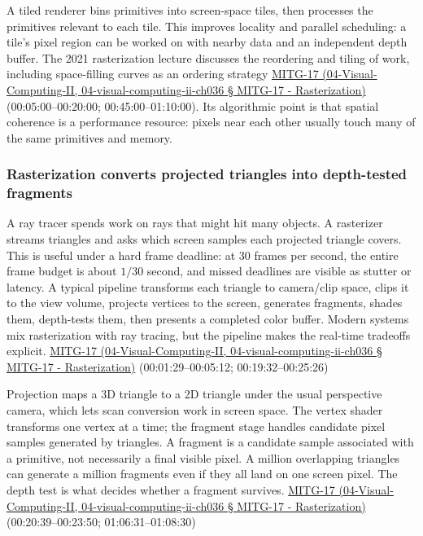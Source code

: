 A tiled renderer bins primitives into screen-space tiles, then processes the primitives relevant to each tile. This improves locality and parallel scheduling: a tile's pixel region can be worked on with nearby data and an independent depth buffer. The 2021 rasterization lecture discusses the reordering and tiling of work, including space-filling curves as an ordering strategy \href{}{MITG-17 (04-Visual-Computing-II, 04-visual-computing-ii-ch036 § MITG-17 - Rasterization)} (00:05:00--00:20:00; 00:45:00--01:10:00). Its algorithmic point is that spatial coherence is a performance resource: pixels near each other usually touch many of the same primitives and memory.

\subsubsection{Rasterization converts projected triangles into depth-tested fragments}\label{rasterization-converts-projected-triangles-into-depth-tested-fragments}

A ray tracer spends work on rays that might hit many objects. A rasterizer streams triangles and asks which screen samples each projected triangle covers. This is useful under a hard frame deadline: at 30 frames per second, the entire frame budget is about \(1/30\) second, and missed deadlines are visible as stutter or latency. A typical pipeline transforms each triangle to camera/clip space, clips it to the view volume, projects vertices to the screen, generates fragments, shades them, depth-tests them, then presents a completed color buffer. Modern systems mix rasterization with ray tracing, but the pipeline makes the real-time tradeoffs explicit. \href{}{MITG-17 (04-Visual-Computing-II, 04-visual-computing-ii-ch036 § MITG-17 - Rasterization)} (00:01:29--00:05:12; 00:19:32--00:25:26)

Projection maps a 3D triangle to a 2D triangle under the usual perspective camera, which lets scan conversion work in screen space. The vertex shader transforms one vertex at a time; the fragment stage handles candidate pixel samples generated by triangles. A fragment is a candidate sample associated with a primitive, not necessarily a final visible pixel. A million overlapping triangles can generate a million fragments even if they all land on one screen pixel. The depth test is what decides whether a fragment survives. \href{}{MITG-17 (04-Visual-Computing-II, 04-visual-computing-ii-ch036 § MITG-17 - Rasterization)} (00:20:39--00:23:50; 01:06:31--01:08:30)

